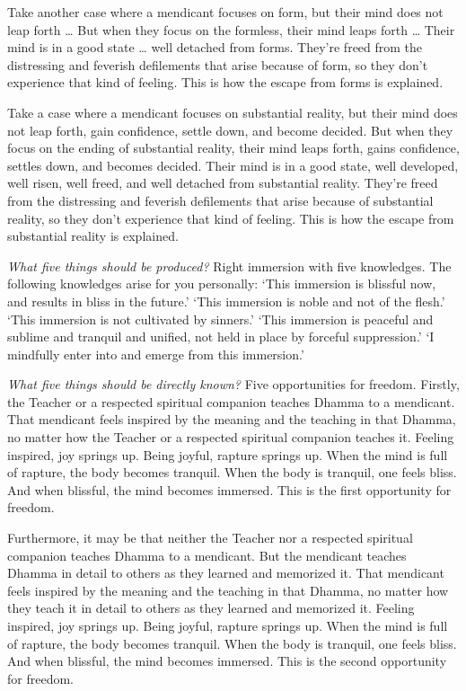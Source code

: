 \documentclass[12pt,openany]{book}%
\begin{document}
Take another case where a mendicant focuses on form, but their mind does not leap forth … But when they focus on the formless, their mind leaps forth … Their mind is in a good state … well detached from forms. They’re freed from the distressing and feverish defilements that arise because of form, so they don’t experience that kind of feeling. This is how the escape from forms is explained. 

Take a case where a mendicant focuses on substantial reality, but their mind does not leap forth, gain confidence, settle down, and become decided. But when they focus on the ending of substantial reality, their mind leaps forth, gains confidence, settles down, and becomes decided. Their mind is in a good state, well developed, well risen, well freed, and well detached from substantial reality. They’re freed from the distressing and feverish defilements that arise because of substantial reality, so they don’t experience that kind of feeling. This is how the escape from substantial reality is explained. 

\emph{What five things should be produced?} Right immersion with five knowledges. The following knowledges arise for you personally: ‘This immersion is blissful now, and results in bliss in the future.’ ‘This immersion is noble and not of the flesh.’ ‘This immersion is not cultivated by sinners.’ ‘This immersion is peaceful and sublime and tranquil and unified, not held in place by forceful suppression.’ ‘I mindfully enter into and emerge from this immersion.’ 

\emph{What five things should be directly known?} Five opportunities for freedom. Firstly, the Teacher or a respected spiritual companion teaches Dhamma to a mendicant. That mendicant feels inspired by the meaning and the teaching in that Dhamma, no matter how the Teacher or a respected spiritual companion teaches it. Feeling inspired, joy springs up. Being joyful, rapture springs up. When the mind is full of rapture, the body becomes tranquil. When the body is tranquil, one feels bliss. And when blissful, the mind becomes immersed. This is the first opportunity for freedom. 

Furthermore, it may be that neither the Teacher nor a respected spiritual companion teaches Dhamma to a mendicant. But the mendicant teaches Dhamma in detail to others as they learned and memorized it. That mendicant feels inspired by the meaning and the teaching in that Dhamma, no matter how they teach it in detail to others as they learned and memorized it. Feeling inspired, joy springs up. Being joyful, rapture springs up. When the mind is full of rapture, the body becomes tranquil. When the body is tranquil, one feels bliss. And when blissful, the mind becomes immersed. This is the second opportunity for freedom. 
\end{document}
